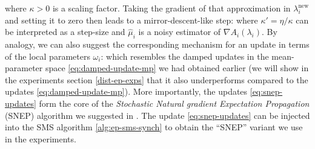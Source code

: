 %
%
where $\kappa>0$ is a scaling factor. Taking the gradient of that approximation in $\lambda_i^{\text{new}}$ and setting it to zero then leads to a mirror-descent-like step:
%
%
where $\kappa'=\eta/\kappa$ can be interpreted as a step-size and $\hat\mu_i$ is a noisy estimator of $\nabla A_i(\lambda_i)$. By analogy, we can also suggest the corresponding mechanism for an update in terms of the local parameters $\omega_i$: 
%
%
which resembles the damped updates in the mean-parameter space \eqref{eq:damped-update-mp} we had obtained earlier (we will show in the experiments section \ref{dist-ep-exps} that it also underperforms compared to the updates \eqref{eq:damped-update-mp}). 
More importantly, the updates \eqref{eq:snep-updates} form the core of the \emph{Stochastic Natural gradient Expectation Propagation} (SNEP) algorithm we suggested in \citet{hasenclever16}.
The update \eqref{eq:snep-updates} can be injected into the SMS algorithm \ref{alg:ep-sms-synch} to obtain the ``SNEP'' variant we use in the experiments.
 



%
%
%
\clearpage
